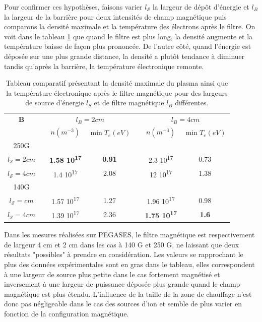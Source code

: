 \begin{refsection}
Pour confirmer ces hypothèses, faisons varier $l_\mathcal{S}$ la largeur de
dépôt d'énergie et $l_B$ la largeur de la barrière pour deux
intensités de champ magnétique puis comparons la densité maximale et la température des électrons après le
filtre. On voit dans le tableau \ref{4-pegasesCompLargeurs} que quand le
filtre est plus long, la densité augmente et la température baisse de façon plus
prononcée.
De l'autre côté, quand l'énergie est déposée sur une plus grande distance, la
densité a plutôt tendance à diminuer tandis qu'après la barrière, la
température électronique remonte.

\begin{table}
\footnotesize\centering
{}
\begin{tabular}{@{}ccccccc@{}}\toprule
\bfseries B&&\multicolumn{2}{c}{$l_B=2cm$} && \multicolumn{2}{c}{$l_B=4cm$}\\
\cmidrule{3-4} \cmidrule{6-7}
&& $n (m^{-3})$ & $\min T_e (eV)$ && $n (m^{-3})$ & $\min T_e (eV)$\\
\midrule 
250G\\
\scriptsize $l_\mathcal{S}=2cm$ &&\bfseries\scriptsize 1.58
10\textsuperscript{17}&\bfseries\scriptsize 0.91&&\scriptsize 2.3
10\textsuperscript{17}&\scriptsize 0.73
\\
\scriptsize $l_\mathcal{S}=4cm$  &&\scriptsize 1.4 10\textsuperscript{17}
&\scriptsize 2.08&&\scriptsize 12 10\textsuperscript{17}&\scriptsize 1.38\\
140G\\
\scriptsize $l_\mathcal{S}=cm$ &&\scriptsize 1.57 10\textsuperscript{17}
&\scriptsize 1.27&&\scriptsize 1.96 10\textsuperscript{17}&\scriptsize 0.98 \\
\scriptsize $l_\mathcal{S}=4cm$  &&\scriptsize 1.39 10\textsuperscript{17}
&\scriptsize 2.36&&\bfseries\scriptsize 1.75 10\textsuperscript{17}&\bfseries\scriptsize
1.6\\
\bottomrule
\end{tabular}
\caption{Tableau comparatif présentant la densité maximale du plasma ainsi que
la température électronique après le filtre magnétique pour des largeurs de
source d'énergie $l_S$ et de filtre magnétique $l_B$ différentes.}
\label{4-pegasesCompLargeurs}
\end{table}

Dans les mesures réalisées sur PEGASES, le filtre magnétique est respectivement
de largeur 4 cm et 2 cm dans les cas à 140 G et 250 G, ne laissant que deux
résultats "possibles" à prendre en considération. 
Les valeurs se rapprochant le plus des données expérimentales sont en gras dans
le tableau, elles correspondent à une largeur de source plus petite dans le cas fortement
magnétisé et inversement à une largeur de puissance déposée plus grande quand le
champ magnétique est plus étendu. L'influence de la taille de la zone de
chauffage n'est donc pas négligeable dans le cas des sources d'ion et semble de
plus varier en fonction de la configuration magnétique.


\end{refsection}
